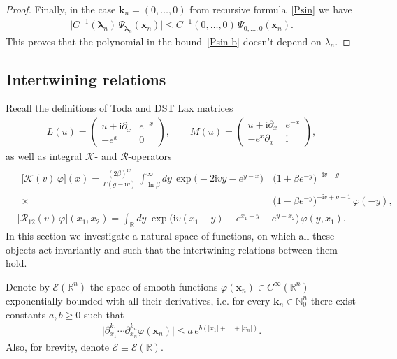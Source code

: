 \documentclass[11pt]{article}
\numberwithin{equation}{section}
\theoremstyle{plain}
\theoremstyle{definition}
\renewcommand{\phi}{\varphi}
\renewcommand{\imath}{\mathrm{i}}
\begin{document}
\begin{proof}
	Finally, in the case $\bm{k}_n = (0, \dots, 0)$ from recursive formula~\eqref{Psin} we have
	\begin{align}
		\bigl| C^{-1}(\bm{\lambda}_n) \, \Psi_{\bm{\lambda}_n}(\bm{x}_n) \bigr| \leq C^{-1}(0, \dots, 0) \, \Psi_{0, \dots, 0}(\bm{x}_n).
	\end{align}
	This proves that the polynomial in the bound~\eqref{Psin-b} doesn't depend on $\lambda_n$.
\end{proof}

\subsection{Intertwining relations} \label{sec:intertw-rel}

Recall the definitions of Toda and DST Lax matrices
\begin{align}\label{LM}
	L(u) = 
	\begin{pmatrix}
		u + \imath \partial_{x} & e^{-x} \\[4pt]
		-e^{x} & 0
	\end{pmatrix}, \qquad 
	M(u) = 
	\begin{pmatrix}
		u + \imath \partial_{x} & e^{-x} \\[4pt]
		-e^{x} \partial_{x} & \imath
	\end{pmatrix},
\end{align}
as well as integral $\mathcal{K}$- and $\mathcal{R}$-operators 
\begin{align} \label{Kop}
	& \begin{aligned}
		\bigl[ \mathcal{K} (v) \, \phi \bigr](x) = \frac{(2\beta)^{\imath v}}{\Gamma ( g- \imath v )} \, \int_{\ln \beta}^{\infty} dy \, \exp \bigl(-2 \imath v y - e^{y -x} \bigr) & \, \bigl(1 + \beta e^{-y}\bigr)^{- \imath v - g } \\ 
		\times & \, \bigl(1 - \beta e^{-y}\bigr)^{- \imath v + g - 1} \, \phi( - y),
	\end{aligned}  \\[6pt]   \label{Rop}
	& \bigl[ \mathcal{R}_{12} (v)\, \phi \bigr](x_1, x_2) 
		= \int_{\mathbb{R}} dy \; \exp \bigl( \imath v(x_1 - y) - e^{x_1 - y} - e^{y - x_2} \bigr) \, \phi(y, x_1).
\end{align}
In this section we investigate a natural space of functions, on which all these objects act invariantly and such that the intertwining relations between them hold.

Denote by $\mathcal{E}(\mathbb{R}^n)$ the space of smooth functions $\phi(\bm{x}_n) \in C^\infty(\mathbb{R}^n)$ exponentially bounded with all their derivatives, i.e. for every $\bm{k}_n \in \mathbb{N}_0^n$ there exist constants $a, b \geq 0$ such that
\begin{align} \label{Edef-bound}
	\bigl| \partial_{x_1}^{k_1} \cdots \partial_{x_n}^{k_n}  \phi (\bm{x}_n) \bigr| \leq a \, e^{b (|x_1| + \ldots + |x_n|)}.
\end{align}
Also, for brevity, denote $\mathcal{E} \equiv \mathcal{E}(\mathbb{R})$. 
\end{document}
